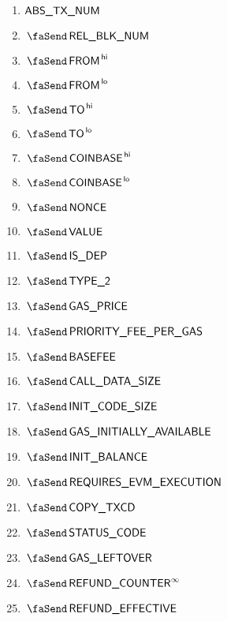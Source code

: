 \begin{description}
\begin{multicols}{3}
\begin{enumerate}
				\item $\textsf{ABS\_TX\_NUM}$
				\item $\txBatchNum$
				\item $\txFrom\high$
				\item $\txFrom\low$
				\item $\txTo\high$
				\item $\txTo\low$
				\item $\txCoinbase\high$
				\item $\txCoinbase\low$
				\item $\txNonce$
				\item $\txValue$
				\item $\txIsDeployment$
				\item $\txIsTypeTwo$
				\item $\txGasPrice$
				\item $\txPriorityFeePerGas$
				\item $\txBasefee$
				\item $\txCallDataSize$
				\item $\txInitCodeSize$
				\item $\txInitialGas$
				\item $\txInitialBalance$
				\item $\txRequiresEvmExecution$
				\item $\txCopyTxcd$ 
				\item $\txStatusCode$
				\item $\txLeftoverGas$
				\item $\txFinalRefundCounter$
				\item $\txEffectiveRefund$
			\end{enumerate}
		\end{multicols}
\end{description}
